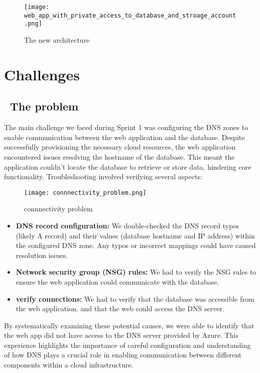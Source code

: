 \begin{figure}[H]
    \centering
    \texttt{[image: web\_app\_with\_private\_access\_to\_database\_and\_stroage\_account.png]}
    \caption{The new architecture}
    \label{fig:new_arch}
\end{figure}


\section{Challenges}
\subsection*{ \textbullet\ The problem}
The main challenge we faced during Sprint 1 was configuring the DNS zones to enable communication between the web application and the database. Despite successfully provisioning the necessary cloud resources, the web application encountered issues resolving the hostname of the database. This meant the application couldn't locate the database to retrieve or store data, hindering core functionality. Troubleshooting involved verifying several aspects:

\begin{figure}[H]
    \centering
    \texttt{[image: connnectivity\_problem.png]}
    \caption{connnectivity problem}
    \label{fig:connection_problem}
\end{figure}

\begin{itemize}
    \item \textbf{DNS record configuration:} We double-checked the DNS record types (likely A record) and their values (database hostname and IP address) within the configured DNS zone. Any typos or incorrect mappings could have caused resolution issues.
    \item \textbf{Network security group (NSG) rules:} We had to verify the NSG rules to ensure the web application could communicate with the database.
    \item \textbf{verify connections:} We had to verify that the database was accessible from the web application. and that the web could access the DNS server.
\end{itemize}
By systematically examining these potential causes, we were able to identify that the web app did not have access to the DNS server provided by Azure. This experience highlights the importance of careful configuration and understanding of how DNS plays a crucial role in enabling communication between different components within a cloud infrastructure.
